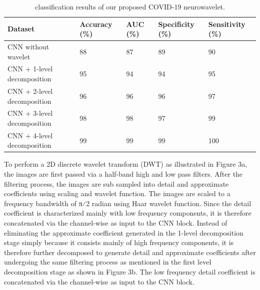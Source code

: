 \documentclass{standalone}
\begin{document}
\begin{table}[]
\centering
\caption{classification results of our proposed COVID-19 neurowavelet.}
\begin{tabular}{lllll}
\toprule
\multicolumn{1}{l}{Dataset}                     & \multicolumn{1}{l}{Accuracy (\%)} & \multicolumn{1}{l}{AUC (\%)} & \multicolumn{1}{l}{Specificity (\%)} & \multicolumn{1}{l}{Sensitivity (\%)} \\\hline
\midrule
CNN   without wavelet                             & 88                                 & 87                            & 89                                    & 90                                    \\
CNN +   1-level decomposition                     & 95                                 & 94                            & 94                                    & 95                                    \\
CNN +   2-level decomposition                     & 96                                 & 96                            & 96                                    & 97                                    \\
CNN +   3-level decomposition                     & 98                                 & 98                            & 97                                    & 99                                    \\ \hline
\multicolumn{1}{l}{CNN + 4-level decomposition} & \multicolumn{1}{l}{99}            & \multicolumn{1}{l}{99}       & \multicolumn{1}{l}{99}               & \multicolumn{1}{l}{100}  \\ \hline
\bottomrule
\end{tabular}
\label{tab2}
\end{table}

To perform a 2D discrete wavelet transform (DWT) as illustrated in Figure 3a, the images are first passed via a half-band high and low pass filters. After the filtering process, the images are sub sampled into detail and approximate coefficients using scaling and wavelet function. The images are scaled to a frequency bandwidth of π⁄2 radian using Haar wavelet function. Since the detail coefficient is characterized mainly with low frequency components, it is therefore concatenated via the channel-wise as input to the CNN block. Instead of eliminating the approximate coefficient generated in the 1-level decomposition stage simply because it consists mainly of high frequency components, it is therefore further decomposed to generate detail and approximate coefficients after undergoing the same filtering process as mentioned in the first level decomposition stage as shown in Figure 3b. The low frequency detail coefficient is concatenated via the channel-wise as input to the CNN block. 
\end{document}
